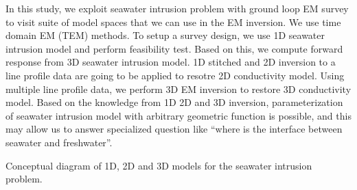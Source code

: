 \documentclass{segabs}
\begin{document}
In this study, we exploit seawater intrusion problem with ground loop EM survey to visit suite of model spaces that we can use in the EM inversion. We use time domain EM (TEM) methods. To setup a survey design, we use 1D seawater intrusion model and perform feasibility test. Based on this, we compute forward response from 3D seawater intrusion model. 1D stitched and 2D inversion to a line profile data are going to be applied to resotre 2D conductivity model. Using multiple line profile data, we perform 3D EM inversion to restore 3D conductivity model. Based on the knowledge from 1D 2D and 3D inversion, parameterization of seawater intrusion model with arbitrary geometric function is possible, and this may allow us to answer specialized question like ``where is the interface between seawater and freshwater''.

{Conceptual diagram of 1D, 2D and 3D models for the seawater intrusion problem.}
\end{document}
